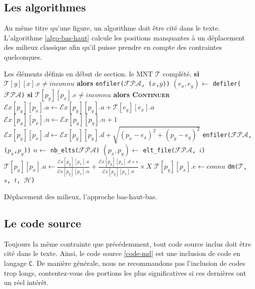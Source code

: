 \documentclass[a4paper, 12pt]{book}
\begin{document}
\subsection{Les algorithmes}
Au même titre qu'une figure, un algorithme doit être cité dans le
texte. L'algorithme \ref{algo-bas-haut} calcule les positions
manquantes à un déplacement des milieux classique afin qu'il puisse
prendre en compte des contraintes quelconques.
\begin{algorithm}
  \begin{algorithmic}
    \footnotesize
    \REQUIRE Les éléments définis en début de section.
    \ENSURE le MNT $\mathcal{T}$ complété.
    \STATE \textbf{si} {$\mathcal{T}[y][x].e \ne inconnu$} \textbf{alors} \texttt{enfiler($\mathcal{FPA}$, ($x$,$y$))}
    \ENDFOR
    \ENDFOR
    \STATE $(e_x, e_y)\leftarrow $ \texttt{defiler($\mathcal{FPA}$)}
    \STATE \textbf{si} {$\mathcal{T}[p_y][p_x].e \ne inconnu$} \textbf{alors \textsc{Continuer}}
    \STATE $\mathcal{E}x[p_y][p_x].a \leftarrow \mathcal{E}x[p_y][p_y].a + \mathcal{T}[e_y][e_x].a$
    \STATE $\mathcal{E}x[p_y][p_x].n \leftarrow \mathcal{E}x[p_y][p_y].n + 1$
    \STATE $\mathcal{E}x[p_y][p_x].d \leftarrow \mathcal{E}x[p_y][p_y].d + \sqrt{(p_x - e_x)^2 + (p_y - e_y)^2}$
    \STATE \texttt{enfiler($\mathcal{FPA}$, ($p_x$,$p_y$))}
    \ENDFOR
    \ENDFOR
    \STATE $n\leftarrow $ \texttt{nb\_elts($\mathcal{FPA}$)}
    \STATE $(p_x, p_y)\leftarrow $ \texttt{elt\_file($\mathcal{FPA}$, $i$)}
    \STATE $\mathcal{T}[p_y][p_x].a \leftarrow \frac{\mathcal{E}x[p_y][p_x].a}{\mathcal{E}x[p_y][p_x].n} + \frac{\mathcal{E}x[p_y][p_x].d\times s}{\mathcal{E}x[p_y][p_x].n} \times X$
    \STATE $\mathcal{T}[p_y][p_x].e \leftarrow connu$
    \ENDFOR
    \ENDWHILE
    \STATE \texttt{dm($\mathcal{T}$, $s$, $t$, $\mathcal{H}$)}
  \end{algorithmic}
  \caption{Déplacement des milieux, l'approche bas-haut-bas.\label{algo-bas-haut}}
\end{algorithm}
\subsection{Le code source}
Toujours la même contrainte que précédemment, tout code source inclus
doit être cité dans le texte. Ainsi, le code source \ref{code-md} est
une inclusion de code en langage \texttt{C}. De manière générale, nous ne
recommandons pas l'inclusion de codes trop longs, contentez-vous des
portions les plus significatives si ces dernières ont un réel intérêt.\\
\end{document}
